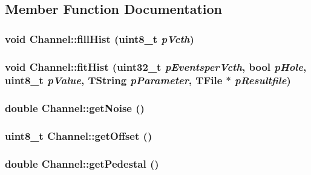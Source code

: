 \subsection{Member Function Documentation}
\hypertarget{struct_channel_db1b3676dac071110ef0df05a9ac8611}{
\subsubsection[fillHist]{\setlength{\rightskip}{0pt plus 5cm}void Channel::fill\-Hist (uint8\_\-t {\em p\-Vcth})}}
\label{struct_channel_db1b3676dac071110ef0df05a9ac8611}


\hypertarget{struct_channel_01bed9b8126d353efbcb93edf93cff4f}{
\subsubsection[fitHist]{\setlength{\rightskip}{0pt plus 5cm}void Channel::fit\-Hist (uint32\_\-t {\em p\-Eventsper\-Vcth}, bool {\em p\-Hole}, uint8\_\-t {\em p\-Value}, TString {\em p\-Parameter}, TFile $\ast$ {\em p\-Resultfile})}}
\label{struct_channel_01bed9b8126d353efbcb93edf93cff4f}


\hypertarget{struct_channel_570a341791f9709d3fca63ffa9ec8e16}{
\subsubsection[getNoise]{\setlength{\rightskip}{0pt plus 5cm}double Channel::get\-Noise ()}}
\label{struct_channel_570a341791f9709d3fca63ffa9ec8e16}


\hypertarget{struct_channel_cb087e09d25e9de182a6d97d8c3dcd6e}{
\subsubsection[getOffset]{\setlength{\rightskip}{0pt plus 5cm}uint8\_\-t Channel::get\-Offset ()}}
\label{struct_channel_cb087e09d25e9de182a6d97d8c3dcd6e}


\hypertarget{struct_channel_e76c0ccc6dc03c5e016cdec79a3df739}{
\subsubsection[getPedestal]{\setlength{\rightskip}{0pt plus 5cm}double Channel::get\-Pedestal ()}}
\label{struct_channel_e76c0ccc6dc03c5e016cdec79a3df739}


